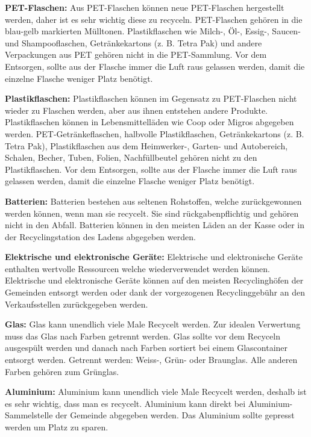 \textbf{PET-Flaschen: }Aus PET-Flaschen können neue PET-Flaschen hergestellt werden, daher ist es sehr wichtig diese zu recyceln. PET-Flaschen gehören in die blau-gelb markierten Mülltonen. Plastikflaschen wie Milch-, Öl-, Essig-, Saucen- und Shampooflaschen, Getränkekartons (z. B. Tetra Pak) und andere Verpackungen aus PET gehören nicht in die PET-Sammlung. Vor dem Entsorgen, sollte aus der Flasche immer die Luft raus gelassen werden, damit die einzelne Flasche weniger Platz benötigt. \par

\textbf{Plastikflaschen: }Plastikflaschen können im Gegensatz zu PET-Flaschen nicht wieder zu Flaschen werden, aber aus ihnen entstehen andere Produkte. Plastikflaschen können in Lebensmittelläden wie Coop oder Migros abgegeben werden. PET-Getränkeflaschen, halbvolle Plastikflaschen, Getränkekartons (z. B. Tetra Pak), Plastikflaschen aus dem Heimwerker-, Garten- und Autobereich, Schalen, Becher, Tuben, Folien, Nachfüllbeutel gehören nicht zu den Plastikflaschen. Vor dem Entsorgen, sollte aus der Flasche immer die Luft raus gelassen werden, damit die einzelne Flasche weniger Platz benötigt. \par

\textbf{Batterien: }Batterien bestehen aus seltenen Rohstoffen, welche zurückgewonnen werden können, wenn man sie recycelt. Sie sind rückgabenpflichtig und gehören nicht in den Abfall. Batterien können in den meisten Läden an der Kasse oder in der Recyclingstation des Ladens abgegeben werden. \par

\textbf{Elektrische und elektronische Geräte: }Elektrische und elektronische Geräte enthalten wertvolle Ressourcen welche wiederverwendet werden können. Elektrische und elektronische Geräte können auf den meisten Recyclinghöfen der Gemeinden entsorgt werden oder dank der vorgezogenen Recyclinggebühr an den Verkaufsstellen zurückgegeben werden. \par

\textbf{Glas: }Glas kann unendlich viele Male Recycelt werden. Zur idealen Verwertung muss das Glas nach Farben getrennt werden. Glas sollte vor dem Recyceln ausgespült werden und danach nach Farben sortiert bei einem Glascontainer entsorgt werden. Getrennt werden: Weiss-, Grün- oder Braunglas. Alle anderen Farben gehören zum Grünglas. \par

\textbf{Aluminium: }Aluminium kann unendlich viele Male Recycelt werden, deshalb ist es sehr wichtig, dass man es recycelt. Aluminium kann direkt bei Aluminium-Sammelstelle der Gemeinde abgegeben werden. Das Aluminium sollte gepresst werden um Platz zu sparen. \par

